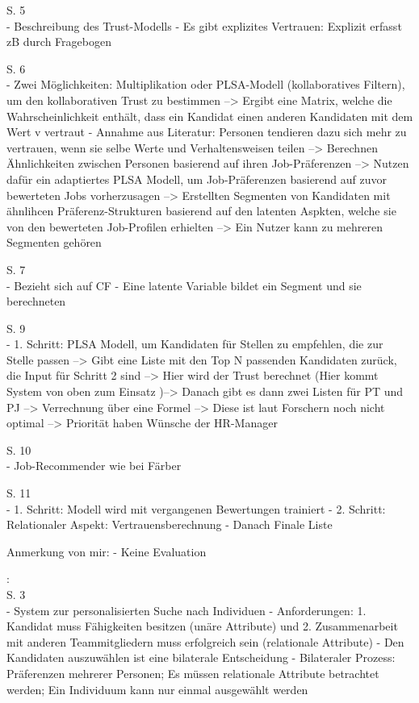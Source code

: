 S. 5\\
- Beschreibung des Trust-Modells
- Es gibt explizites Vertrauen: Explizit erfasst zB durch Fragebogen

S. 6\\
- Zwei Möglichkeiten: Multiplikation oder PLSA-Modell (kollaboratives Filtern), um den kollaborativen Trust zu bestimmen --> Ergibt eine Matrix, welche die Wahrscheinlichkeit enthält, dass ein Kandidat einen anderen Kandidaten mit dem Wert v vertraut
- Annahme aus Literatur: Personen tendieren dazu sich mehr zu vertrauen, wenn sie selbe Werte und Verhaltensweisen teilen --> Berechnen Ähnlichkeiten zwischen Personen basierend auf ihren Job-Präferenzen --> Nutzen dafür ein adaptiertes PLSA Modell, um Job-Präferenzen basierend auf zuvor bewerteten Jobs vorherzusagen --> Erstellten Segmenten von Kandidaten mit ähnlihcen Präferenz-Strukturen basierend auf den latenten Aspkten, welche sie von den bewerteten Job-Profilen erhielten --> Ein Nutzer kann zu mehreren Segmenten gehören

S. 7\\
- Bezieht sich auf CF
- Eine latente Variable bildet ein Segment und sie berechneten

S. 9\\
- 1. Schritt: PLSA Modell, um Kandidaten für Stellen zu empfehlen, die zur Stelle passen --> Gibt eine Liste mit den Top N passenden Kandidaten zurück, die Input für Schritt 2 sind --> Hier wird der Trust berechnet (Hier kommt System von oben zum Einsatz )--> Danach gibt es dann zwei Listen für PT und PJ --> Verrechnung über eine Formel --> Diese ist laut Forschern noch nicht optimal --> Priorität haben Wünsche der HR-Manager

S. 10\\
- Job-Recommender wie bei Färber

S. 11\\
- 1. Schritt: Modell wird mit vergangenen Bewertungen trainiert
- 2. Schritt: Relationaler Aspekt: Vertrauensberechnung
- Danach Finale Liste

Anmerkung von mir:
- Keine Evaluation

\textcite{keim:2005}:\\
S. 3\\
- System zur personalisierten Suche nach Individuen
- Anforderungen: 1. Kandidat muss Fähigkeiten besitzen (unäre Attribute) und 2. Zusammenarbeit mit anderen Teammitgliedern muss erfolgreich sein (relationale Attribute)
- Den Kandidaten auszuwählen ist eine bilaterale Entscheidung
- Bilateraler Prozess: Präferenzen mehrerer Personen; Es müssen relationale Attribute betrachtet werden; Ein Individuum kann nur einmal ausgewählt werden

